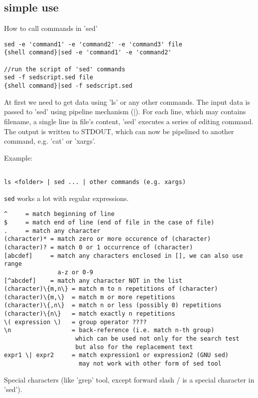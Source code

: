 \subsection{simple use}

How to call commands in 'sed'
\begin{verbatim}
sed -e 'command1' -e 'command2' -e 'command3' file
{shell command}|sed -e 'command1' -e 'command2' 

//run the script of 'sed' commands
sed -f sedscript.sed file
{shell command}|sed -f sedscript.sed
\end{verbatim}

At first we need to get data using 'ls' or any other commands. The input data is
passed to 'sed' using pipeline mechanism (|). For each line, which may contains
filename, a single line in file's content, 'sed' executes a series of editing command. The
output is written to STDOUT, which can now be pipelined to another command, e.g.
'cat' or 'xargs'.

Example:
\begin{verbatim}

ls <folder> | sed ... | other commands (e.g. xargs)
\end{verbatim}

\verb!sed! works a lot with regular expressions.

\begin{verbatim}
^     = match beginning of line
$     = match end of line (end of file in the case of file)
.     = match any character
(character)* = match zero or more occurence of (character)
(character)? = match 0 or 1 occurrence of (character)
[abcdef]     = match any characters enclosed in [], we can also use range
               a-z or 0-9
[^abcdef]    = match any character NOT in the list
(character)\{m,n\} = match m to n repetitions of (character)
(character)\{m,\}  = match m or more repetitions
(character)\{,n\}  = match n or less (possibly 0) repetitions
(character)\{n\}   = match exactly n repetitions
\( expression \)   = group operator ????
\n                 = back-reference (i.e. match n-th group)
                    which can be used not only for the search test
                    but also for the replacement text
expr1 \| expr2     = match expression1 or expression2 (GNU sed) 
                     may not work with other form of sed tool
\end{verbatim}
Special characters (like 'grep' tool, except forward slash / is a special
character in 'sed').



